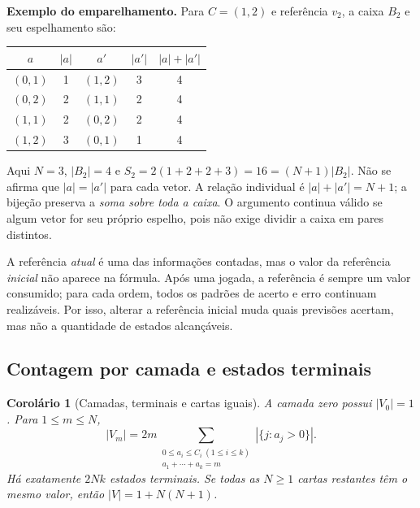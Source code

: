 \documentclass[11pt,a4paper]{article}
\newtheorem{corolario}[proposicao]{Corolário}
\theoremstyle{definition}
\newcommand{\destaque}[1]{\par\smallskip\noindent\textbf{#1}\enspace}
\newcommand{\proxpagina}{\newpage}
\begin{document}
\destaque{Exemplo do emparelhamento.}
Para $C=(1,2)$ e referência $v_2$, a caixa $B_2$ e seu espelhamento são:
\begin{center}
\begin{tabular}{@{}ccccc@{}}
\toprule
$a$ & $|a|$ & $a'$ & $|a'|$ & $|a|+|a'|$\\
\midrule
$(0,1)$ & 1 & $(1,2)$ & 3 & 4\\
$(0,2)$ & 2 & $(1,1)$ & 2 & 4\\
$(1,1)$ & 2 & $(0,2)$ & 2 & 4\\
$(1,2)$ & 3 & $(0,1)$ & 1 & 4\\
\bottomrule
\end{tabular}
\end{center}
Aqui $N=3$, $|B_2|=4$ e $S_2=2(1+2+2+3)=16=(N+1)|B_2|$. Não se afirma que $|a|=|a'|$ para cada vetor. A relação individual é $|a|+|a'|=N+1$; a bijeção preserva a \emph{soma sobre toda a caixa}. O argumento continua válido se algum vetor for seu próprio espelho, pois não exige dividir a caixa em pares distintos.

A referência \emph{atual} é uma das informações contadas, mas o valor da referência \emph{inicial} não aparece na fórmula. Após uma jogada, a referência é sempre um valor consumido; para cada ordem, todos os padrões de acerto e erro continuam realizáveis. Por isso, alterar a referência inicial muda quais previsões acertam, mas não a quantidade de estados alcançáveis.

\proxpagina
\subsection{Contagem por camada e estados terminais}
\begin{corolario}[Camadas, terminais e cartas iguais]\label{cor:camadas}
A camada zero possui $|V_0|=1$. Para $1\le m\le N$,
\begin{equation}\label{eq:camadas}
\boxed{\displaystyle |V_m|=2m\!\sum_{\substack{0\le a_i\le C_i\ (1\le i\le k)\\a_1+\cdots+a_k=m}}\!|\{j:a_j>0\}|.}
\end{equation}
Há exatamente $2Nk$ estados terminais. Se todas as $N\ge1$ cartas restantes têm o mesmo valor, então $|V|=1+N(N+1)$.
\end{corolario}
\end{document}
